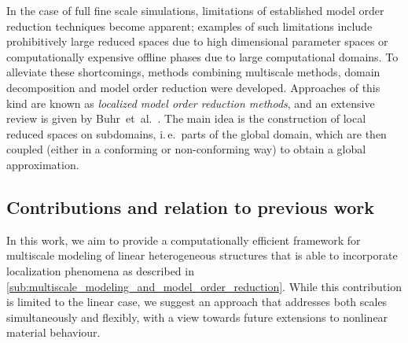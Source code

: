 \documentclass[AMA,STIX1COL,doublespace]{WileyNJD-v2}
\begin{document}
In the case of full fine scale simulations, limitations of established model order reduction techniques become apparent;
examples of such limitations include prohibitively large reduced spaces due to high dimensional parameter spaces or computationally expensive offline phases due to large computational domains.
To alleviate these shortcomings, methods combining multiscale methods, domain decomposition and model order reduction were developed.
Approaches of this kind are known as \textit{localized model order reduction methods}, and an extensive review is given by Buhr~et~al.~\cite{BuhrEtAlInBook2020}.
The main idea is the construction of local reduced spaces on subdomains, i.\,e.\ parts of the global domain, which are then coupled (either in a conforming or non-conforming way) to obtain a global approximation. 

\subsection{Contributions and relation to previous work}%
\label{sub:contributions_and_relation_to_previous_work}

In this work, we aim to provide a computationally efficient framework
for multiscale modeling of linear heterogeneous structures that is able to incorporate
localization phenomena as described in
\cref{sub:multiscale_modeling_and_model_order_reduction}.
While this contribution is limited to the linear case,
we suggest an approach that addresses both scales simultaneously and flexibly,
with a view towards future extensions to nonlinear material behaviour.
\end{document}
